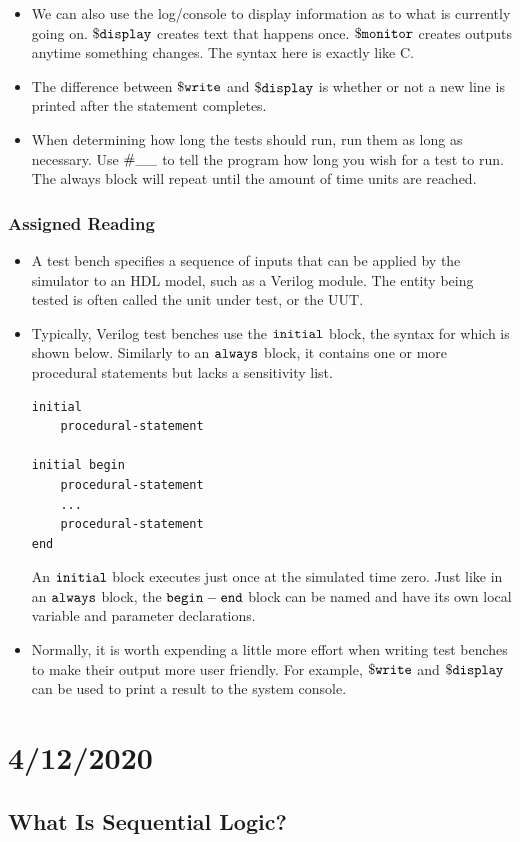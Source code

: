 \documentclass[10pt,a4paper]{article}
\begin{document}
\begin{itemize}
\item We can also use the log/console to display information as to what is currently going on. $\tt{\$display}$ creates text that happens once. $\tt{\$monitor}$ creates outputs anytime something changes. The syntax here is exactly like C. 
\item The difference between $\tt{\$write}$ and $\tt{\$display}$ is whether or not a new line is printed after the statement completes. 
\item When determining how long the tests should run, run them as long as necessary. Use $\tt{\#\_\_}$ to tell the program how long you wish for a test to run. The always block will repeat until the amount of time units are reached. 
\end{itemize}
\subsubsection{Assigned Reading}
\begin{itemize}
\item A test bench specifies a sequence of inputs that can be applied by the simulator to an HDL model, such as a Verilog module. The entity being tested is often called the unit under test, or the UUT. 
\item Typically, Verilog test benches use the $\tt{initial}$ block, the syntax for which is shown below. Similarly to an $\tt{always}$ block, it contains one or more procedural statements but lacks a sensitivity list.
\begin{lstlisting}
initial
	procedural-statement

initial begin
	procedural-statement
	...
	procedural-statement
end
\end{lstlisting}
An $\tt{initial}$ block executes just once at the simulated time zero. Just like in an $\tt{always}$ block, the $\tt{begin-end}$ block can be named and have its own local variable and parameter declarations.
\item Normally, it is worth expending a little more effort when writing test benches to make their output more user friendly. For example, $\tt{\$write}$ and $\tt{\$display}$ can be used to print a result to the system console. 
\end{itemize}
\pagebreak
\section{4/12/2020}
\subsection{What Is Sequential Logic?}
\end{document}
